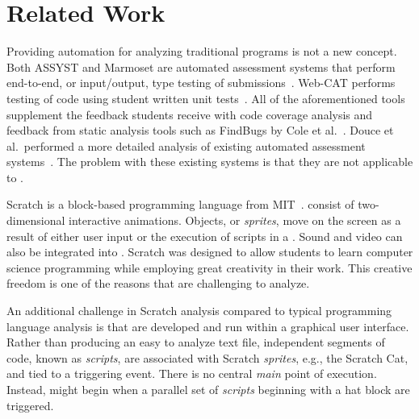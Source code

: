 \section{Related Work}

Providing automation for analyzing traditional programs is not a new concept.
Both ASSYST and Marmoset are automated assessment systems that perform
end-to-end, or input/output, type testing of
submissions~\cite{Spacco:2006:EMD:1140124.1140131,
  Jackson:1997:GSP:268084.268210}. Web-CAT performs testing of code using
student written unit tests~\cite{Edwards:2003:RCS:949344.949390}. All of the
aforementioned tools supplement the feedback students receive with code
coverage analysis and feedback from static analysis tools such as FindBugs by
Cole et al.~\cite{Cole:2006:IYS:1176617.1176667}. Douce et al.\ performed a
more detailed analysis of existing automated assessment
systems~\cite{Douce:2005:ATA:1163405.1163409}.  The problem with these existing
systems is that they are not applicable to .

Scratch is a block-based programming language from
MIT~\cite{Maloney:2010:SPL:1868358.1868363}.   consist of
two-dimensional interactive animations.  Objects, or \emph{sprites}, move on
the screen as a result of either user input or the execution of scripts in a
\sprogram{}.  Sound and video can also be integrated into .
Scratch was designed to allow students to learn computer science programming
while employing great creativity in their work.  This creative freedom is one
of the reasons that  are challenging to analyze.

An additional challenge in Scratch analysis compared to typical programming
language analysis is that  are developed and run within a graphical
user interface. Rather than producing an easy to analyze text file, independent
segments of code, known as \emph{scripts}, are associated with Scratch
\emph{sprites}, e.g., the Scratch Cat, and tied to a triggering event.  There
is no central \emph{main} point of execution.  Instead,  might
begin when a parallel set of \emph{scripts} beginning with a \greenflag{} hat
block are triggered.

